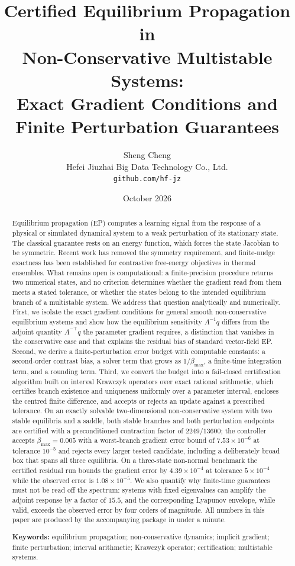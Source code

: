 \documentclass[11pt]{article}
\title{\bfseries Certified Equilibrium Propagation in\\ Non-Conservative Multistable Systems:\\[3pt]
Exact Gradient Conditions and Finite Perturbation Guarantees}
\author{Sheng Cheng\\ \small Hefei Jiuzhai Big Data Technology Co., Ltd.\\ \small \texttt{github.com/hf-jz}}
\date{October 2026}
\theoremstyle{definition}
\theoremstyle{remark}
\newcommand{\betamax}{\beta_{\max}}
\begin{document}
\maketitle

\begin{abstract}
\noindent
Equilibrium propagation (EP) computes a learning signal from the response of a physical or
simulated dynamical system to a weak perturbation of its stationary state. The classical
guarantee rests on an energy function, which forces the state Jacobian to be symmetric. Recent
work has removed the symmetry requirement, and finite-nudge exactness has been established for
contrastive free-energy objectives in thermal ensembles. What remains open is computational:
a finite-precision procedure returns two numerical states, and no criterion determines whether
the gradient read from them meets a stated tolerance, or whether the states belong to the
intended equilibrium branch of a multistable system. We address that
question analytically and numerically. First, we isolate the exact gradient conditions for
general smooth non-conservative equilibrium systems and show how the equilibrium sensitivity
$A^{-1}q$ differs from the adjoint quantity $A^{-\top}q$ the parameter gradient requires, a
distinction that vanishes in the conservative case and that explains the residual bias of
standard vector-field EP. Second, we derive a finite-perturbation error budget with computable
constants: a second-order contrast bias, a solver term that grows as $1/\betamax$, a finite-time
integration term, and a rounding term. Third, we convert the budget into a fail-closed
certification algorithm built on interval Krawczyk operators over exact rational arithmetic,
which certifies branch existence and uniqueness uniformly over a parameter interval, encloses
the centred finite difference, and accepts or rejects an update against a prescribed tolerance.
On an exactly solvable two-dimensional non-conservative system with two stable equilibria and a
saddle, both stable branches and both perturbation endpoints are certified with a preconditioned
contraction factor of $2249/13600$; the controller accepts $\betamax = 0.005$ with a worst-branch
gradient error bound of $7.53\times10^{-6}$ at tolerance $10^{-5}$ and rejects every larger tested
candidate, including a deliberately broad box that spans all three equilibria. On a three-state
non-normal benchmark the certified residual run bounds the gradient error by
$4.39\times10^{-4}$ at tolerance $5\times10^{-4}$ while the observed error is
$1.08\times10^{-5}$. We also quantify why finite-time guarantees must not be read off the
spectrum: systems with fixed eigenvalues can amplify the adjoint response by a factor of $15.5$,
and the corresponding Lyapunov envelope, while valid, exceeds the observed error by four orders of
magnitude. All numbers in this paper are produced by the accompanying package in
under a minute.

\vspace{6pt}
\noindent\textbf{Keywords:} equilibrium propagation; non-conservative dynamics; implicit
gradient; finite perturbation; interval arithmetic; Krawczyk operator; certification;
multistable systems.
\end{abstract}
\end{document}
